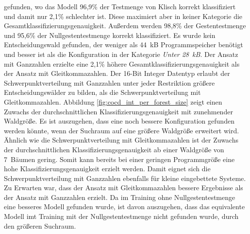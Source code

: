 gefunden, wo das Modell 96,9\% der Testmenge von Klisch korrekt klassifiziert und damit nur 2,1\% schlechter ist. Diese maximiert aber in keiner Kategorie die Gesamtklassifizierungsgenauigkeit.
Außerdem werden 98,8\% der Gestentestmenge und 95,6\% der Nullgestentestmenge korrekt klassifiziert. Es wurde kein Entscheidungswald gefunden, der weniger als 44~kB Programmspeicher benötigt und besser ist als die
Konfiguration in der Kategorie \textit{Unter 28~kB}.
\newline
\newline
Der Ansatz mit Ganzzahlen erzielte eine 2,1\% höhere Gesamtklassifizierungsgenauigkeit als der Ansatz mit Gleitkommazahlen. Der 16-Bit Integer Datentyp erlaubt der Schwerpunktverteilung mit Ganzzahlen unter jeder
Restriktion größere Entscheidungswälder zu bilden, als die Schwerpunktverteilung mit Gleitkommazahlen. Abbildung \ref{fig:cocd_int_per_forest_size} zeigt einen Zuwachs der durchschnittlichen Klassifizierungsgenauigkeit
mit zunehmender Waldgröße. Es ist auszugehen, dass eine noch bessere Konfiguration gefunden werden könnte, wenn der Suchraum auf eine größere Waldgröße erweitert wird. Ähnlich wie die Schwerpunktverteilung mit
Gleitkommazahlen ist der Zuwachs der durchschnittlichen Klassifizierungsgenauigkeit ab einer Waldgröße von 7~Bäumen gering. Somit kann bereits bei einer geringen Programmgröße eine hohe Klassifizierungsgenauigkeit
erzielt werden. Damit eignet sich die Schwerpunktverteilung mit Ganzzahlen ebenfalls für kleine eingebettete Systeme.
\newline
\newline
Zu Erwarten war, dass der Ansatz mit Gleitkommazahlen bessere Ergebnisse als der Ansatz mit Ganzzahlen erzielt. Da im Training ohne Nullgestentestmenge eine besseres Modell gefunden wurde, ist davon
auszugehen, dass das equivalente Modell imt Training mit der Nullgestentestmenge nicht gefunden wurde, durch den größeren Suchraum.